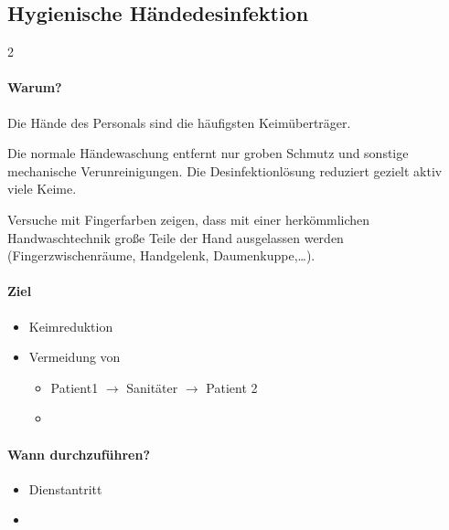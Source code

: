 \clearpage
\subsection{Hygienische Händedesinfektion}
\label{topic:hygienische-haendedesfinfektion}
% 

\begin{gWideParEnv}

\begin{multicols}{2}
\paragraph{Warum?} 
Die Hände des Personals sind die
häufigsten Keimüberträger. 

Die normale Händewaschung entfernt nur groben Schmutz und
sonstige mechanische Verunreinigungen. Die
Desinfektionlösung reduziert gezielt aktiv viele Keime. 

Versuche mit Fingerfarben
zeigen, dass mit einer herkömmlichen Handwaschtechnik große
Teile der Hand ausgelassen werden (Fingerzwischenräume,
Handgelenk, Daumenkuppe,\ldots).

\begin{minipage}{\linewidth}

\paragraph{Ziel}
\begin{itemize}
    \item Keimreduktion
    \item Vermeidung von 
    \begin{itemize}
        \item Patient1 ${\rightarrow}$ Sanitäter ${\rightarrow}$ Patient 2
        \item {}
    \end{itemize}
\end{itemize}
\paragraph{Wann durchzuführen?}
\begin{itemize}
    \item Dienstantritt
    \item {}
\end{itemize}

\end{minipage}
\end{multicols}
\end{gWideParEnv}
